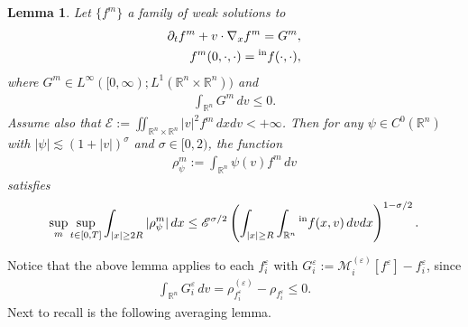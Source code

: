 \documentclass[10pt,reqno]{amsart}
\numberwithin{equation}{section}
\newtheorem{lemma}{Lemma}[section]
\newcommand{\R}{\mathbb R}
\newcommand{\intr}{\int_{\R^n}}
\newcommand{\calM}{\mathcal M}
\newcommand{\p}{\partial}
\newcommand{\ve}{\varepsilon}
\begin{document}
\begin{lemma}
    \cite[Lemma 3.4]{KS24} Let $\{f^m\}$ a family of weak solutions to
    \begin{align*}
        \p_t f^m + v\cdot \nabla_x f^m = G^m,\\
        f^m(0,\cdot,\cdot) = {}^{\rm in}f(\cdot,\cdot),
    \end{align*}
    where $G^m\in L^\infty([0,\infty);L^1(\R^n \times \R^n))$ and
    \begin{align*}
        \intr G^m\,dv \le 0.
    \end{align*}
    Assume also that $\mathscr{E} := \iint_{\R^n \times \R^n} |v|^2 f^m\,dxdv < +\infty$. Then for any $\psi\in C^0(\R^n)$ with $|\psi|\lesssim (1+|v|)^{\sigma}$ and $\sigma\in [0,2)$, the function
    \begin{align*}
        \rho_{\psi}^m := \intr \psi(v) f^m\,dv
    \end{align*}
    satisfies
    \begin{align*}
        \sup_m \sup_{t\in [0,T]}\int_{|x|\ge 2R} |\rho_{\psi}^m|\,dx \le \mathscr{E}^{\sigma/2} \left(\int_{|x|\ge R} \intr {}^{\rm in}f(x,v)\,dvdx \right)^{1-\sigma/2}.
    \end{align*}
\end{lemma}
Notice that the above lemma applies to each $f_i^\ve$ with $G_i^\ve := \calM_i^{(\ve)}[f^\ve] - f_i^\ve$, since
\begin{align*}
    \intr G_i^\ve\,dv = \rho_{f_i^\ve}^{(\ve)} - \rho_{f_i^\ve} \le 0.
\end{align*}
Next to recall is the following averaging lemma.
\end{document}
